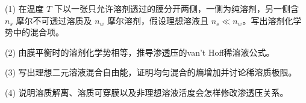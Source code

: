(1) 在温度 \(T\) 下以一张只允许溶剂透过的膜分开两侧，一侧为纯溶剂，另一侧含 \(n_s\) 摩尔不可透过溶质及 \(n_w\) 摩尔溶剂，假设理想溶液且 \(n_s\ll n_w\)。写出溶剂化学势中的混合项。

(2) 由膜平衡时的溶剂化学势相等，推导渗透压的van't Hoff稀溶液公式。

(3) 写出理想二元溶液混合自由能，证明均匀混合的熵增加并讨论稀溶质极限。

(4) 说明溶质解离、溶质可穿膜以及非理想溶液活度会怎样修改渗透压关系。

